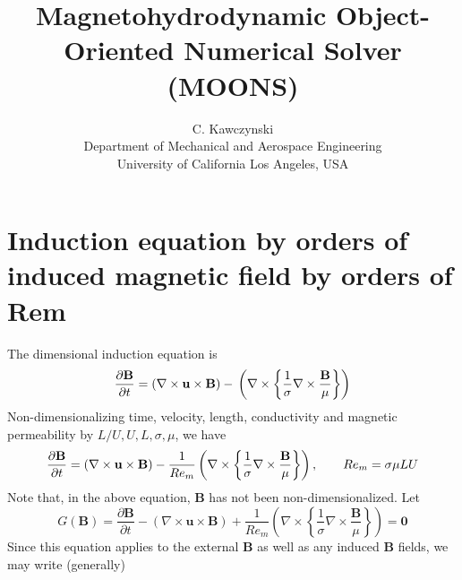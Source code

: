 \documentclass[11pt]{article}
\newcommand{\B}{\mathbf{B}}
\newcommand{\PD}{\partial}
\newcommand{\U}{\mathbf{u}}
\begin{document}
\doublespacing
\title{Magnetohydrodynamic Object-Oriented Numerical Solver (MOONS)}
\author{C. Kawczynski \\
Department of Mechanical and Aerospace Engineering \\
University of California Los Angeles, USA\\
}

\section{Induction equation by orders of induced magnetic field by orders of Rem}
The dimensional induction equation is
\begin{equation} \label{eq:ind_dim}
  \frac{\PD \B}{\PD t} 
  =
  (\nabla \times \U \times \B)
  - \\
  \left(
  \nabla \times
  \left\{
  \frac{1}{\sigma}
  \nabla \times
  \frac{\B}{\mu}
  \right\}
  \right)
\end{equation}
Non-dimensionalizing time, velocity, length, conductivity and magnetic permeability by $L/U,U,L,\sigma,\mu$, we have
\begin{equation} \label{eq:ind}
  \frac{\PD \B}{\PD t} 
  =
  (\nabla \times \U \times \B)
  - \\
  \frac{1}{Re_m}
  \left(
  \nabla \times
  \left\{
  \frac{1}{\sigma}
  \nabla \times
  \frac{\B}{\mu}
  \right\}
  \right)
  ,\qquad Re_m = \sigma \mu LU
\end{equation}
Note that, in the above equation, $\B$ has not been non-dimensionalized. Let
\begin{equation}
  G(\B)
  =
  \frac{\PD \B}{\PD t} 
  -
  (\nabla \times \U \times \B)
  +
  \frac{1}{Re_m}
  \left(
  \nabla \times
  \left\{
  \frac{1}{\sigma}
  \nabla \times
  \frac{\B}{\mu}
  \right\}
  \right)
  =
  \mathbf{0}
\end{equation}
Since this equation applies to the external $\B$ as well as any induced $\B$ fields, we may write (generally)
\end{document}
